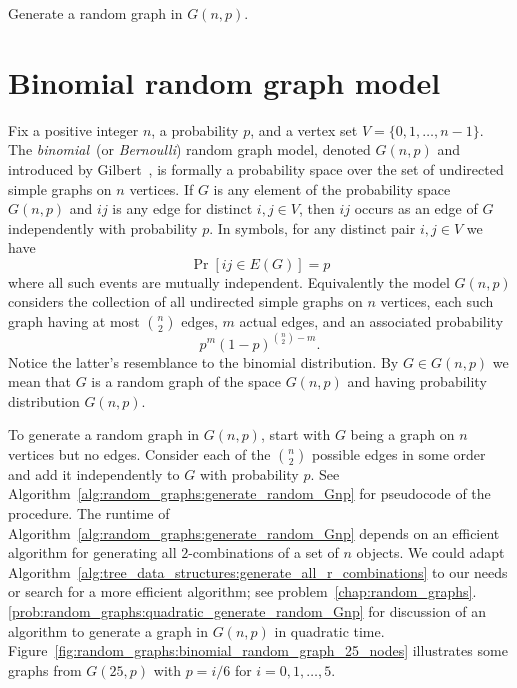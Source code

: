 \begin{algorithm}[!htbp]

\caption{Generate a random graph in $G(n,p)$.}
\label{alg:random_graphs:generate_random_Gnp}
\end{algorithm}





\section{Binomial random graph model}

Fix a positive integer $n$, a probability $p$, and a vertex set
$V = \{0, 1, \dots, n - 1\}$. The
\emph{binomial}~(or
\emph{Bernoulli}) random graph model,
denoted $G(n,p)$ and introduced by Gilbert~\cite{Gilbert1959}, is
formally a probability space over the set of
undirected simple graphs on $n$ vertices. If $G$ is any element of the
probability space $G(n,p)$ and $ij$ is any edge for distinct
$i,j \in V$, then $ij$ occurs as an edge of $G$ independently with
probability $p$. In symbols, for any distinct pair $i,j \in V$ we have
\[
\Pr[ij \in E(G)]
=
p
\]
where all such events are mutually independent. Equivalently the model
$G(n,p)$ considers the collection of all undirected simple graphs on
$n$ vertices, each such graph having at most $\binom{n}{2}$ edges, $m$
actual edges, and an associated probability
\begin{equation}
\label{eqn:random_graphs:probability_of_chosen_graph_binomial_model}
p^m (1 - p)^{\binom{n}{2} - m}.
\end{equation}
Notice the latter's resemblance to the
binomial distribution. By
$G \in G(n,p)$ we mean that $G$ is a random graph of the space
$G(n,p)$ and having probability
distribution $G(n,p)$.

To generate a random graph in $G(n,p)$, start with $G$ being a graph
on $n$ vertices but no edges. Consider each of the $\binom{n}{2}$
possible edges in some order and add it independently to $G$ with
probability $p$. See
Algorithm~\ref{alg:random_graphs:generate_random_Gnp} for pseudocode
of the procedure. The runtime of
Algorithm~\ref{alg:random_graphs:generate_random_Gnp} depends on an
efficient algorithm for generating all $2$-combinations of a set of
$n$ objects. We could adapt
Algorithm~\ref{alg:tree_data_structures:generate_all_r_combinations}
to our needs or search for a more efficient algorithm; see
problem~\ref{chap:random_graphs}.\ref{prob:random_graphs:quadratic_generate_random_Gnp}
for discussion of an algorithm to generate a graph in $G(n,p)$ in
quadratic
time. Figure~\ref{fig:random_graphs:binomial_random_graph_25_nodes}
illustrates some graphs from $G(25,p)$ with $p = i/6$ for
$i = 0, 1, \dots, 5$.

